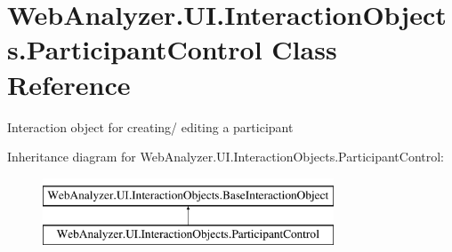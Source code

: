\hypertarget{class_web_analyzer_1_1_u_i_1_1_interaction_objects_1_1_participant_control}{}\section{Web\+Analyzer.\+U\+I.\+Interaction\+Objects.\+Participant\+Control Class Reference}
\label{class_web_analyzer_1_1_u_i_1_1_interaction_objects_1_1_participant_control}


Interaction object for creating/ editing a participant  


Inheritance diagram for Web\+Analyzer.\+U\+I.\+Interaction\+Objects.\+Participant\+Control\+:\begin{figure}[H]
\begin{center}
\leavevmode
\includegraphics[height=2.000000cm]{class_web_analyzer_1_1_u_i_1_1_interaction_objects_1_1_participant_control}
\end{center}
\end{figure}
